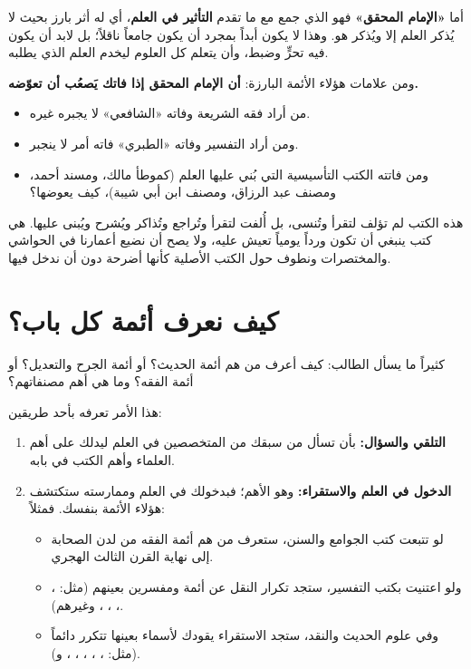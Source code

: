 أما \textbf{«الإمام المحقق»} فهو الذي جمع مع ما تقدم \textbf{التأثير في العلم}، أي له أثر بارز بحيث لا يُذكر العلم إلا ويُذكر هو. وهذا لا يكون أبداً بمجرد أن يكون جامعاً ناقلاً؛ بل لابد أن يكون فيه تحرٍّ وضبط، وأن يتعلم كل العلوم ليخدم العلم الذي يطلبه. 

ومن علامات هؤلاء الأئمة البارزة: \textbf{أن الإمام المحقق إذا فاتك يَصعُب أن تعوّضه.} 
\begin{itemize}
    \item من أراد فقه الشريعة وفاته «الشافعي» لا يجبره غيره.
    \item ومن أراد التفسير وفاته «الطبري» فاته أمر لا ينجبر.
    \item ومن فاتته الكتب التأسيسية التي بُني عليها العلم (كموطأ مالك، ومسند أحمد، ومصنف عبد الرزاق، ومصنف ابن أبي شيبة)، كيف يعوضها؟
\end{itemize}
هذه الكتب لم تؤلف لتقرأ وتُنسى، بل أُلفت لتقرأ وتُراجع وتُذاكر ويُشرح ويُبنى عليها. هي كتب ينبغي أن تكون ورداً يومياً تعيش عليه، ولا يصح أن نضيع أعمارنا في الحواشي والمختصرات ونطوف حول الكتب الأصلية كأنها أضرحة دون أن ندخل فيها.

\separator

\section{كيف نعرف أئمة كل باب؟}
كثيراً ما يسأل الطالب: كيف أعرف من هم أئمة الحديث؟ أو أئمة الجرح والتعديل؟ أو أئمة الفقه؟ وما هي أهم مصنفاتهم؟ 

هذا الأمر تعرفه بأحد طريقين:
\begin{enumerate}
    \item \textbf{التلقي والسؤال:} بأن تسأل من سبقك من المتخصصين في العلم ليدلك على أهم العلماء وأهم الكتب في بابه.
    \item \textbf{الدخول في العلم والاستقراء:} وهو الأهم؛ فبدخولك في العلم وممارسته ستكتشف هؤلاء الأئمة بنفسك. فمثلاً:
    \begin{itemize}
        \item لو تتبعت كتب الجوامع والسنن، ستعرف من هم أئمة الفقه من لدن الصحابة إلى نهاية القرن الثالث الهجري.
        \item ولو اعتنيت بكتب التفسير، ستجد تكرار النقل عن أئمة ومفسرين بعينهم (مثل: ، ، ، ، وغيرهم).
        \item وفي علوم الحديث والنقد، ستجد الاستقراء يقودك لأسماء بعينها تتكرر دائماً (مثل: ، ، ، ، ، و).
    \end{itemize}
\end{enumerate}

